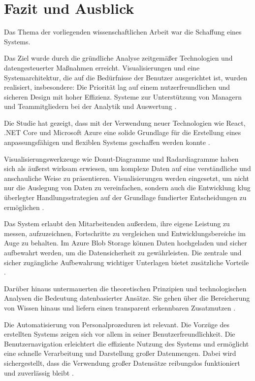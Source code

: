 \chapter{Fazit und Ausblick} 
\label{chap:fazit}

Das Thema der vorliegenden wissenschaftlichen Arbeit war die Schaffung eines Systems.

Das Ziel wurde durch die gründliche Analyse zeitgemäßer Technologien und datengesteuerter Maßnahmen erreicht. Visualisierungen und eine Systemarchitektur, die auf die Bedürfnisse der Benutzer ausgerichtet ist, wurden realisiert, insbesondere: Die Priorität lag auf einem nutzerfreundlichen und sicheren Design mit hoher Effizienz. Systeme zur Unterstützung von Managern und Teammitgliedern bei der Analytik und Auswertung \cite{heer2012interactive, chen2012interactive}.

Die Studie hat gezeigt, dass mit der Verwendung neuer Technologien wie React, .NET Core und Microsoft Azure eine solide Grundlage für die Erstellung eines anpassungsfähigen und flexiblen Systems geschaffen werden konnte \cite{boneder2023evaluation}.

Visualisierungswerkzeuge wie Donut-Diagramme und Radardiagramme haben sich als äußerst wirksam erwiesen, um komplexe Daten auf eine verständliche und anschauliche Weise zu präsentieren. Visualisierungen werden eingesetzt, um nicht nur die Auslegung von Daten zu vereinfachen, sondern auch die Entwicklung klug überlegter Handlungsstrategien auf der Grundlage fundierter Entscheidungen zu ermöglichen \cite{tambe2019artificial}.

Das System erlaubt den Mitarbeitenden außerdem, ihre eigene Leistung zu messen, aufzuzeichnen, Fortschritte zu vergleichen und Entwicklungsbereiche im Auge zu behalten. Im Azure Blob Storage können Daten hochgeladen und sicher aufbewahrt werden, um die Datensicherheit zu gewährleisten. Die zentrale und sicher zugängliche Aufbewahrung wichtiger Unterlagen bietet zusätzliche Vorteile \cite{aral2012threeway}.

Darüber hinaus untermauerten die theoretischen Prinzipien und technologischen Analysen die Bedeutung datenbasierter Ansätze. Sie gehen über die Bereicherung von Wissen hinaus und liefern einen transparent erkennbaren Zusatznutzen \cite{sedlmair2011information}.

Die Automatisierung von Personalprozeduren ist relevant. Die Vorzüge des erstellten Systems zeigen sich vor allem in seiner Benutzerfreundlichkeit. Die Benutzernavigation erleichtert die effiziente Nutzung des Systems und ermöglicht eine schnelle Verarbeitung und Darstellung großer Datenmengen. Dabei wird sichergestellt, dass die Verwendung großer Datensätze reibungslos funktioniert und zuverlässig bleibt \cite{burnett2021future}.

